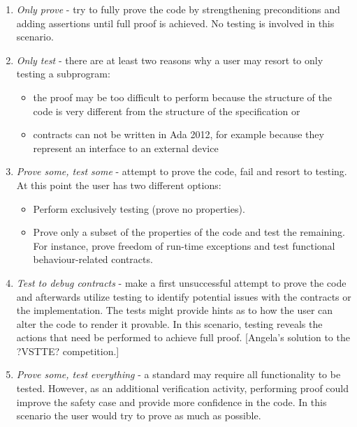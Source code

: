 \documentclass{llncs}
\begin{document}
\begin {enumerate}
\item \emph{Only prove} - try to fully prove
  the code by strengthening preconditions and adding assertions until
  full proof is achieved. No testing is involved in this scenario.

\item \emph{Only test} - there are at least two reasons why a user
   may resort to only testing a subprogram:

   \begin{itemize}
      \item the proof may be too difficult to perform because the 
            structure of the code is very different from the structure
            of the specification or

      \item contracts can not be written in Ada 2012, for example 
            because they represent an interface to an external device
   \end{itemize}


\item \emph{Prove some, test some} - attempt to prove the code, fail
  and resort to testing. At this point the user has two different
  options:

  \begin{itemize}
  \item Perform exclusively testing (prove no properties).

  \item Prove only a subset of the properties of the code and test the
    remaining. For instance, prove freedom of run-time exceptions and
    test functional behaviour-related contracts.
  \end{itemize}

\item \emph{Test to debug contracts} - make a first unsuccessful
  attempt to prove the code and afterwards utilize testing to identify
  potential issues with the contracts or the implementation. The tests
  might provide hints as to how the user can alter the code to render
  it provable. In this scenario, testing reveals the actions that need
  be performed to achieve full proof. [Angela's solution to the
  ?VSTTE? competition.]

\item \emph{Prove some, test everything} - a standard may require
  all functionality to be tested. 
  However, as an additional verification activity, performing proof could
  improve the safety case and provide more confidence in the code. In
  this scenario the user would try to prove as much as possible.
\end{enumerate}
\end{document}
